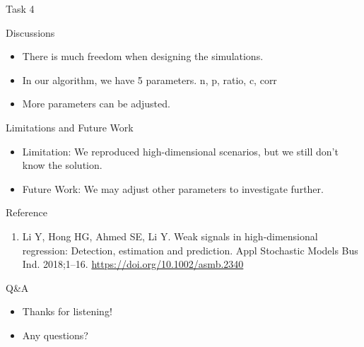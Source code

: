 \documentclass[
  ignorenonframetext,
]{beamer}
\providecommand{\tightlist}{%
  \setlength{\itemsep}{0pt}\setlength{\parskip}{0pt}}
\begin{document}
\begin{frame}{Task 4}
\protect\hypertarget{task-4}{}
\end{frame}

\begin{frame}{Discussions}
\protect\hypertarget{discussions}{}
\begin{itemize}
\item
  There is much freedom when designing the simulations.
\item
  In our algorithm, we have 5 parameters. n, p, ratio, c, corr
\item
  More parameters can be adjusted.
\end{itemize}
\end{frame}

\begin{frame}{Limitations and Future Work}
\protect\hypertarget{limitations-and-future-work}{}
\begin{itemize}
\item
  Limitation: We reproduced high-dimensional scenarios, but we still
  don't know the solution.
\item
  Future Work: We may adjust other parameters to investigate further.
\end{itemize}
\end{frame}

\begin{frame}{Reference}
\protect\hypertarget{reference}{}
\begin{enumerate}
\tightlist
\item
  Li Y, Hong HG, Ahmed SE, Li Y. Weak signals in high‐dimensional
  regression: Detection, estimation and prediction. Appl Stochastic
  Models Bus Ind. 2018;1--16. \url{https://doi.org/10.1002/asmb.2340}
\end{enumerate}
\end{frame}

\begin{frame}{Q\&A}
\protect\hypertarget{qa}{}
\begin{itemize}
\item
  Thanks for listening!
\item
  Any questions?
\end{itemize}
\end{frame}
\end{document}
